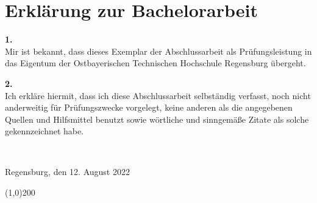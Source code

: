 \thispagestyle{empty}
\chapter*{Erklärung zur Bachelorarbeit}

\bigskip
\bigskip 
\bigskip 

\textbf{1.}\\[1ex]
    Mir ist bekannt, dass dieses Exemplar der Abschlussarbeit als Prüfungsleistung in das Eigentum der Ostbayerischen Technischen Hochschule Regensburg übergeht.

\textbf{2.}\\[1ex]
    Ich erkläre hiermit, dass ich diese Abschlussarbeit selbständig verfasst, noch nicht anderweitig für Prüfungszwecke vorgelegt, keine anderen als die angegebenen Quellen und Hilfsmittel benutzt sowie wörtliche und sinngemäße Zitate als solche gekennzeichnet habe.

\bigskip 
\bigskip 
\bigskip 
~\hfill\begin{minipage}{.5\textwidth}

Regensburg, den 12. August 2022

\bigskip 
\bigskip

\line(1,0){200}
\newline
\stud

\end{minipage}

